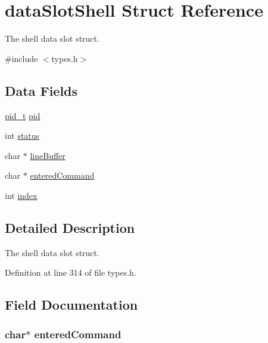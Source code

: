 \hypertarget{structdata_slot_shell}{
\section{dataSlotShell Struct Reference}
\label{structdata_slot_shell}
}


The shell data slot struct.  




{\ttfamily \#include $<$types.h$>$}

\subsection*{Data Fields}
\begin{DoxyCompactItemize}
\item 
\hyperlink{types_8h_ab612a3a4eb0e2ced1e55ecff76260458}{pid\_\-t} \hyperlink{structdata_slot_shell_ae0d46a978d5cd6707411f276ad869b9c}{pid}
\item 
int \hyperlink{structdata_slot_shell_a6e27f49150e9a14580fb313cc2777e00}{status}
\item 
char $\ast$ \hyperlink{structdata_slot_shell_ae8b496c8abc98d4ba2e5f3d7992c93b7}{lineBuffer}
\item 
char $\ast$ \hyperlink{structdata_slot_shell_a17d176b0ae4937f21ebecf9d335c1f9e}{enteredCommand}
\item 
int \hyperlink{structdata_slot_shell_a750b5d744c39a06bfb13e6eb010e35d0}{index}
\end{DoxyCompactItemize}


\subsection{Detailed Description}
The shell data slot struct. 

Definition at line 314 of file types.h.



\subsection{Field Documentation}
\hypertarget{structdata_slot_shell_a17d176b0ae4937f21ebecf9d335c1f9e}{
\subsubsection[{enteredCommand}]{\setlength{\rightskip}{0pt plus 5cm}char$\ast$ {\bf enteredCommand}}}
\label{structdata_slot_shell_a17d176b0ae4937f21ebecf9d335c1f9e}


